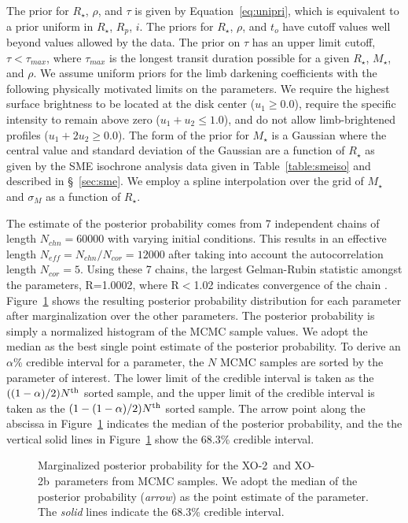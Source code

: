 \documentclass{emulateapj}
\newcommand{\xonb}{XO-2b}
\newcommand{\xon}{XO-2}
\begin{document}
The prior for $R_{\star}$, $\rho$, and $\tau$ is given by
Equation~\ref{eq:unipri}, which is equivalent to a prior uniform in
$R_{\star}$, $R_{p}$, $i$.  The priors for $R_{\star}$, $\rho$, and
$t_{o}$ have cutoff values well beyond values allowed by the data.
The prior on $\tau$ has an upper limit cutoff, $\tau<\tau_{max}$,
where $\tau_{max}$ is the longest transit duration possible for a
given $R_{\star}$, $M_{\star}$, and $\rho$.  We assume uniform priors for the
limb darkening coefficients with the following physically motivated
limits on the parameters.  We require the highest surface brightness
to be located at the disk center ($u_{1}\geq 0.0$), require the
specific intensity to remain above zero ($u_{1}+u_{2}\leq 1.0$), and
do not allow limb-brightened profiles ($u_{1}+2u_{2}\geq 0.0$).  The
form of the prior for $M_{\star}$ is a Gaussian where the central
value and standard deviation of the Gaussian are a function of
$R_{\star}$ as given by the SME isochrone analysis data given in
Table~\ref{table:smeiso} and described in \S~\ref{sec:sme}.  We employ
a spline interpolation over the grid of $M_{\star}$ and $\sigma_{M}$
as a function of $R_{\star}$.

The estimate of the posterior probability comes from 7 independent
chains of length $N_{chn}=60000$ with varying initial conditions.
This results in an effective length $N_{eff}=N_{chn}/N_{cor}=12000$
after taking into account the autocorrelation length $N_{cor}=5$.
Using these 7 chains, the largest Gelman-Rubin statistic amongst the
parameters, R=1.0002, where R$<$1.02 indicates convergence of the
chain \citep{GEL92}.  Figure~\ref{maspost} shows the resulting
posterior probability distribution for each parameter after
marginalization over the other parameters.  The posterior probability
is simply a normalized histogram of the MCMC sample values.  We adopt
the median as the best single point estimate of the posterior
probability.  To derive an $\alpha$\% credible interval for a
parameter, the $N$ MCMC samples are sorted by the parameter of
interest.  The lower limit of the credible interval is taken as the
$((1-\alpha)/2)N^{\rm th}$ sorted sample, and the upper limit of the
credible interval is taken as the $(1-(1-\alpha)/2)N^{\rm th}$ sorted
sample.  The arrow point along the abscissa in Figure~\ref{maspost}
indicates the median of the posterior probability, and the the
vertical solid lines in Figure~\ref{maspost} show the 68.3\% credible
interval.

\begin{figure}
\caption{Marginalized posterior probability for the \xon\ and \xonb\ parameters from MCMC samples.  We adopt the median of the posterior probability ({\it arrow}) as the point estimate of the parameter.  The {\it solid} lines indicate the 68.3\% credible interval.\label{maspost}}
\end{figure}
\end{document}
